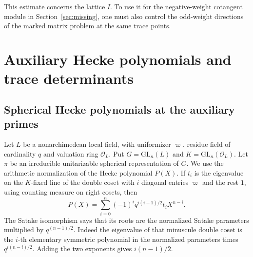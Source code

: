\documentclass[a4paper,11pt]{article}
\theoremstyle{definition}
\theoremstyle{remark}
\numberwithin{equation}{section}
\begin{document}
This estimate concerns the lattice \(I\). To use it for the
negative-weight cotangent module in Section~\ref{sec:missing},
one must also control the odd-weight directions of the marked
matrix problem at the same trace points.

\section{Auxiliary Hecke polynomials and trace determinants}\label{nav:hecke-polynomials}

\subsection{Spherical Hecke polynomials at the auxiliary primes}
\label{sec:heckechains716}

Let \(L\) be a nonarchimedean local field, with uniformizer
\(\varpi\), residue field of cardinality \(q\) and valuation
ring \(\mathcal O_L\). Put \(G=\mathrm{GL}_n(L)\) and
\(K=\mathrm{GL}_n(\mathcal O_L)\). Let \(\pi\) be an irreducible
unitarizable spherical representation of \(G\). We use the
arithmetic normalization of the Hecke polynomial \(P(X)\).
If \(t_i\) is the eigenvalue on the \(K\)-fixed line of the
double coset with \(i\) diagonal entries \(\varpi\) and the rest
\(1\), using counting measure on right cosets, then
\[
           P(X)=\sum_{i=0}^n(-1)^i q^{i(i-1)/2}t_iX^{n-i}.
\]
The Satake isomorphism says that its roots are the normalized
Satake parameters multiplied by \(q^{(n-1)/2}\). Indeed the
eigenvalue of that minuscule double coset is the \(i\)-th
elementary symmetric polynomial in the normalized parameters
times \(q^{i(n-i)/2}\). Adding the two exponents gives
\(i(n-1)/2\).
\end{document}
